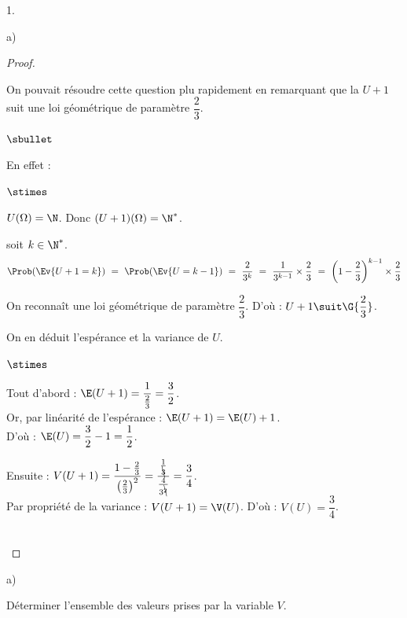 \documentclass[11pt]{article}%
\begin{document}
\begin{noliste}{1.}
\begin{noliste}{a)}
\begin{proof}
      \begin{remark}
        On pouvait résoudre cette question plu rapidement en remarquant
        que la \var $U+1$ suit une loi géométrique de paramètre
        $\dfrac{2}{3}$.
        \begin{noliste}{$\sbullet$}
	  \item En effet :
	  \begin{noliste}{$\stimes$}
	    \item $U(\Omega)=\N$. Donc $(U+1)(\Omega)
	    =\N^*$.
	    \item soit $k\in \N^*$.
	    \[
	      \Prob(\Ev{U+1=k}) \ = \ \Prob(\Ev{U=k-1}) \ = \
	      \dfrac{2}{3^k} \ = \ \dfrac{1}{3^{k-1}} \times 
	      \dfrac{2}{3} \ = \ \left(1-\dfrac{2}{3}\right)^{k-1}
	      \times \dfrac{2}{3}
	    \]
	  \end{noliste}
	  On reconnaît une loi géométrique de paramètre 
	    $\dfrac{2}{3}$.
	    D'où : $U+1 \suit \G{\dfrac{2}{3}}$.
	  
	  \item On en déduit l'espérance et la variance de $U$.
	  \begin{noliste}{$\stimes$}
	    \item Tout d'abord : $\E(U+1) = \dfrac{1}{\frac{2}{3}}
	    =\dfrac{3}{2}$.\\
	    Or, par linéarité de l'espérance : $\E(U+1)=\E(U)+1$.\\
	    D'où : $\E(U) = \dfrac{3}{2}-1 = \dfrac{1}{2}$.
	    
	    \item Ensuite : $V(U+1) = \dfrac{1-\frac{2}{3}}
	    {\big(\frac{2}{3}\big)^2} = \dfrac{\frac{1}{\bcancel{3}}}
	    {\frac{4}{3^{\bcancel{2}}}} = \dfrac{3}{4}$.\\
	    Par propriété de la variance : $V(U+1)=\V(U)$. D'où :
	    $V(U)=\dfrac{3}{4}$.
	  \end{noliste}
        \end{noliste}
      \end{remark}~\\[-1.4cm]
    \end{proof}
  \end{noliste}
  
  
  \newpage
  
  
  \item 
  \begin{noliste}{a)}
    \setlength{\itemsep}{2mm}
    \item Déterminer l'ensemble des valeurs prises par la variable $V$.
    

\end{noliste}
\end{noliste}
\end{document}
